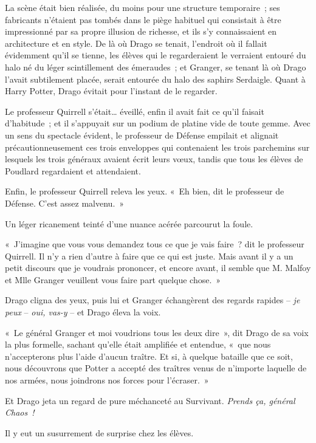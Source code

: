 \later

La scène était bien réalisée, du moins pour une structure temporaire~; ses fabricants n'étaient pas tombés dans le piège habituel qui consistait à être impressionné par sa propre illusion de richesse, et ils s'y connaissaient en architecture et en style.
De là où Drago se tenait, l'endroit où il fallait évidemment qu'il se tienne, les élèves qui le regarderaient le verraient entouré du halo né du léger scintillement des émeraudes~; et Granger, se tenant là où Drago l'avait subtilement placée, serait entourée du halo des saphirs Serdaigle.
Quant à Harry Potter, Drago évitait pour l'instant de le regarder.

Le professeur Quirrell s'était… éveillé, enfin il avait fait ce qu'il faisait d'habitude~; et il s'appuyait sur un podium de platine vide de toute gemme.
Avec un sens du spectacle évident, le professeur de Défense empilait et alignait précautionneusement ces trois enveloppes qui contenaient les trois parchemins sur lesquels les trois généraux avaient écrit leurs vœux, tandis que tous les élèves de Poudlard regardaient et attendaient.

Enfin, le professeur Quirrell releva les yeux.
«~Eh bien, dit le professeur de Défense.
C'est assez malvenu.~»

Un léger ricanement teinté d'une nuance acérée parcourut la foule.

«~J'imagine que vous vous demandez tous ce que je vais faire~? dit le professeur Quirrell.
Il n'y a rien d'autre à faire que ce qui est juste.
Mais avant il y a un petit discours que je voudrais prononcer, et encore avant, il semble que M. Malfoy et Mlle Granger veuillent vous faire part quelque chose.~»

Drago cligna des yeux, puis lui et Granger échangèrent des regards rapides -- \emph{je peux} -- \emph{oui, vas-y} -- et Drago éleva la voix.

«~Le général Granger et moi voudrions tous les deux dire~», dit Drago de sa voix la plus formelle, sachant qu'elle était amplifiée et entendue, «~que nous n'accepterons plus l'aide d'aucun traître.
Et si, à quelque bataille que ce soit, nous découvrons que Potter a accepté des traîtres venus de n'importe laquelle de nos armées, nous joindrons nos forces pour l'écraser.~»

Et Drago jeta un regard de pure méchanceté au Survivant.
\emph{Prends ça, général Chaos~!}

Il y eut un susurrement de surprise chez les élèves.

